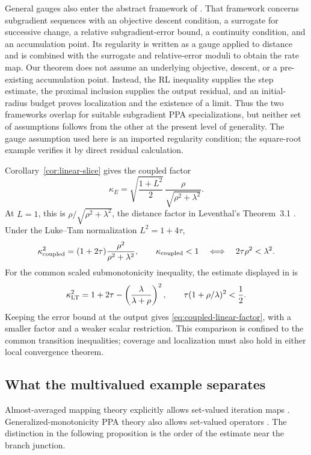 General gauges also enter the abstract framework of
\cite[Theorems~4.3--4.4]{LiMordukhovichZhu2026GeneralizedSubregularity}.
That framework concerns subgradient sequences with an objective descent
condition, a surrogate for successive change, a relative subgradient-error
bound, a continuity condition, and an accumulation point.  Its regularity is
written as a gauge applied to distance and is combined with the surrogate and
relative-error moduli to obtain the rate map.  Our theorem does not assume an
underlying objective, descent, or a pre-existing accumulation point.  Instead,
the RL inequality supplies the step estimate, the proximal inclusion supplies
the output residual, and an initial-radius budget proves localization and the
existence of a limit.  Thus the two frameworks overlap for suitable
subgradient PPA specializations, but neither set of assumptions follows from
the other at the present level of generality.  The gauge assumption used here
is an imported regularity condition; the square-root example verifies it by
direct residual calculation.

Corollary~\ref{cor:linear-slice} gives the coupled factor
\[
 \kappa_E=
 \sqrt{\frac{1+L^2}{2}}\,
 \frac{\rho}{\sqrt{\rho^2+\lambda^2}}.
\]
At $L=1$, this is
$\rho/\sqrt{\rho^2+\lambda^2}$, the distance factor in
Leventhal's Theorem~3.1 \cite{Leventhal2009MetricSubregularityPPA}.
Under the Luke--Tam normalization $L^2=1+4\tau$,
\begin{equation}
 \kappa_{\rm coupled}^2
 =(1+2\tau)\frac{\rho^2}{\rho^2+\lambda^2},
 \qquad
 \kappa_{\rm coupled}<1
 \quad\Longleftrightarrow\quad
 2\tau\rho^2<\lambda^2.
 \label{eq:coupled-linear-factor}
\end{equation}
For the common scaled submonotonicity inequality, the estimate displayed in
\cite{LukeTam2025GeneralizedMonotonicity} is
\[
 \kappa_{\rm LT}^2
 =1+2\tau-\left(\frac{\lambda}{\lambda+\rho}\right)^2,
 \qquad
 \tau(1+\rho/\lambda)^2<\frac12.
\]
Keeping the error bound at the output gives
\eqref{eq:coupled-linear-factor}, with a smaller factor and a weaker scalar
restriction.  This comparison is confined to the common transition
inequalities; coverage and localization must also hold in either local
convergence theorem.

\subsection{What the multivalued example separates}

Almost-averaged mapping theory explicitly allows set-valued iteration maps
\cite{LukeThaoTam2018Quantitative}.  Generalized-monotonicity PPA theory also
allows set-valued operators
\cite{LukeTam2025GeneralizedMonotonicity,
EvensPasLatafatPatrinos2025SemimonotonePPA}.  The distinction in the following
proposition is the order of the estimate near the branch junction.

